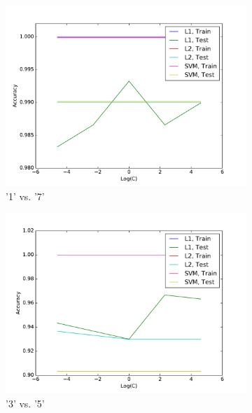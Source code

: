 \documentclass[10pt,psamsfonts]{amsart}
\theoremstyle{definition}
\theoremstyle{remark}
\numberwithin{equation}{section}
\begin{document}
\begin{figure}[t]
	\centering
	\begin{subfigure}[b]{0.23\textwidth}
		\includegraphics[width=\textwidth]{hw2_4-1_1v7.pdf}
		\caption{'1' vs. '7'}
	\end{subfigure}
	\begin{subfigure}[b]{0.23\textwidth}
		\includegraphics[width=\textwidth]{hw2_4-1_3v5.pdf}
		\caption{'3' vs. '5'}
	\end{subfigure}
	\begin{subfigure}[b]{0.23\textwidth}

\end{subfigure}
\end{figure}
\end{document}
